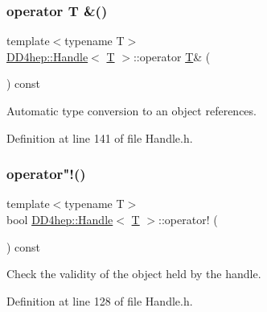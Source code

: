 \hypertarget{class_d_d4hep_1_1_handle_a9e2360ed8586b1a063bc1478d8cae3b7}{}\label{class_d_d4hep_1_1_handle_a9e2360ed8586b1a063bc1478d8cae3b7} 
\subsubsection{\texorpdfstring{operator T \&()}{operator T \&()}}
{\footnotesize\ttfamily template$<$typename T$>$ \\
\hyperlink{class_d_d4hep_1_1_handle}{D\+D4hep\+::\+Handle}$<$ \hyperlink{class_t}{T} $>$\+::operator \hyperlink{class_t}{T}\& (\begin{DoxyParamCaption}{ }\end{DoxyParamCaption}) const\hspace{0.3cm}{\ttfamily [inline]}}



Automatic type conversion to an object references. 



Definition at line 141 of file Handle.\+h.

\hypertarget{class_d_d4hep_1_1_handle_a2de5168f72effa7ecff312c72215ca89}{}\label{class_d_d4hep_1_1_handle_a2de5168f72effa7ecff312c72215ca89} 
\subsubsection{\texorpdfstring{operator"!()}{operator!()}}
{\footnotesize\ttfamily template$<$typename T$>$ \\
bool \hyperlink{class_d_d4hep_1_1_handle}{D\+D4hep\+::\+Handle}$<$ \hyperlink{class_t}{T} $>$\+::operator! (\begin{DoxyParamCaption}{ }\end{DoxyParamCaption}) const\hspace{0.3cm}{\ttfamily [inline]}}



Check the validity of the object held by the handle. 



Definition at line 128 of file Handle.\+h.

\hypertarget{class_d_d4hep_1_1_handle_ac7cbc85a83d5aaa4aca1a3c0ba0e92f6}{}\label{class_d_d4hep_1_1_handle_ac7cbc85a83d5aaa4aca1a3c0ba0e92f6} 
